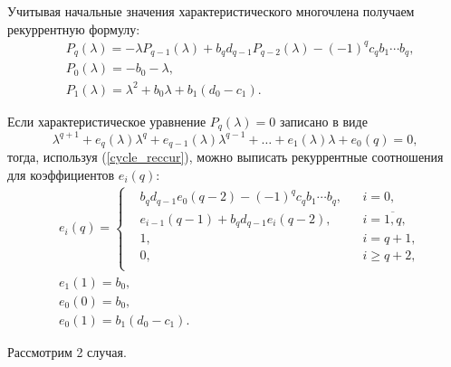 Учитывая начальные значения характеристического многочлена получаем рекуррентную формулу:
\begin{equation} \label{cycle_reccur}
    \begin{split}
        & P_q (\lambda) = -\lambda P_{q-1} (\lambda) + b_q d_{q-1} P_{q-2} (\lambda) - (-1)^{q} c_q b_1 \cdots b_q, \\
        & P_0 (\lambda) = - b_0 -\lambda, \\
        & P_1 (\lambda) = \lambda^2 + b_0 \lambda + b_1 (d_0 - c_1).
    \end{split}
\end{equation}

Если характеристическое уравнение \( P_q (\lambda) = 0 \) записано в виде
\begin{equation*}
    \lambda^{q+1} + e_q(\lambda) \lambda^q + e_{q-1}(\lambda) \lambda^{q-1} + \dots + e_{1}(\lambda) \lambda + e_0(q) = 0,
\end{equation*}
тогда, используя (\ref{cycle_reccur}), можно выписать рекуррентные  соотношения для коэффициентов \(e_i (q)\):
\begin{equation} \label{cycle_reccur_coeffs}
    \begin{split}
    & e_i (q) = \left\{\begin{split}
        & b_q d_{q-1} e_0(q-2) - (-1)^q c_q b_1 \cdots b_q, && i = 0, \\
        & e_{i-1} (q-1) + b_q d_{q-1} e_i (q-2), && i = \overline{1,q}, \\
        & 1, && i = q+1, \\
        & 0, && i \geq q+2, \\
    \end{split}\right. \\
    & e_{1} (1) = b_0, \\
    & e_{0} (0) = b_0, \\
    & e_{0} (1) = b_1 (d_0 - c_1).
    \end{split}
\end{equation}

Рассмотрим 2 случая.

